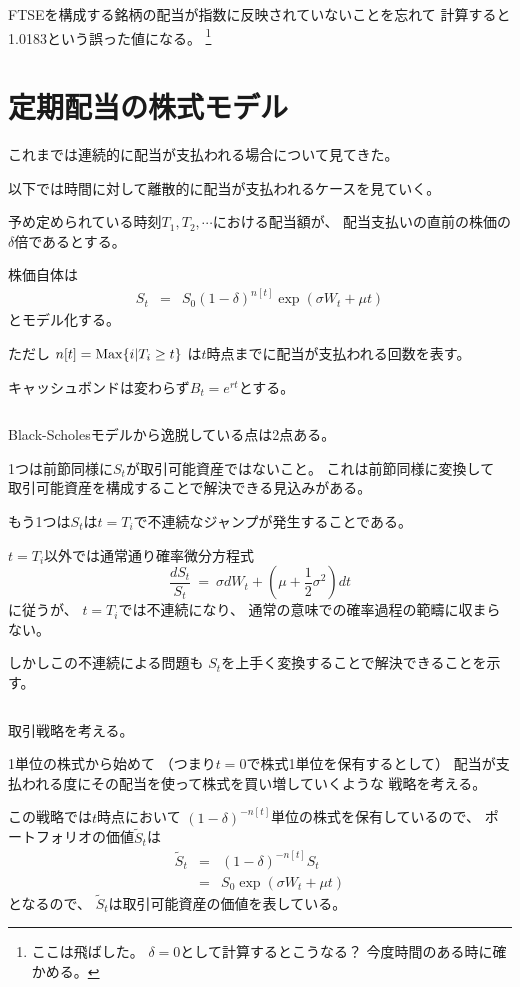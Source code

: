 \documentclass[uplatex,a4j,12pt,dvipdfmx]{jsarticle}
\begin{document}
FTSEを構成する銘柄の配当が指数に反映されていないことを忘れて
計算すると1.0183という誤った値になる。
\footnote{ここは飛ばした。
	$\delta=0$として計算するとこうなる？
	今度時間のある時に確かめる。}
\section{定期配当の株式モデル}

これまでは連続的に配当が支払われる場合について見てきた。

以下では時間に対して離散的に配当が支払われるケースを見ていく。

予め定められている時刻$T_{1},T_{2},\cdots$における配当額が、
配当支払いの直前の株価の$\delta$倍であるとする。

株価自体は
%
%
\begin{eqnarray*}
	S_{t}
	&=&
	S_{0} (1-\delta)^{n[t]}
	\exp(\sigma W_{t} + \mu t)
\end{eqnarray*}
%
%
とモデル化する。

ただし
$n[t]={\rm Max} \{ i | T_{i} \geq t\}$
は$t$時点までに配当が支払われる回数を表す。

キャッシュボンドは変わらず$B_{t}=e^{rt}$とする。

${}$

Black-Scholesモデルから逸脱している点は2点ある。

1つは前節同様に$S_{t}$が取引可能資産ではないこと。
これは前節同様に変換して
取引可能資産を構成することで解決できる見込みがある。

もう1つは$S_{t}$は$t=T_{i}$で不連続なジャンプが発生することである。

$t=T_{i}$以外では通常通り確率微分方程式
$$
	\dfrac{dS_{t}}{S_{t}}
	\ = \
	\sigma d W_{t}
	+
	\left( \mu + \dfrac{1}{2} \sigma^{2} \right)
	dt
$$
に従うが、
$t=T_{i}$では不連続になり、
通常の意味での確率過程の範疇に収まらない。

しかしこの不連続による問題も
$S_{t}$を上手く変換することで解決できることを示す。

${}$

取引戦略を考える。

1単位の株式から始めて
（つまり$t=0$で株式1単位を保有するとして）
配当が支払われる度にその配当を使って株式を買い増していくような
戦略を考える。

この戦略では$t$時点において
$(1-\delta)^{-n[t]}$単位の株式を保有しているので、
ポートフォリオの価値$\tilde{S}_{t}$は
%
%
\begin{eqnarray*}
	\tilde{S}_{t}
	&=&
	(1-\delta)^{-n[t]} S_{t}
	\\ &=&
	S_{0}
	\exp(\sigma W_{t} + \mu t)
\end{eqnarray*}
%
%
となるので、
$\tilde{S}_{t}$は取引可能資産の価値を表している。
\end{document}
